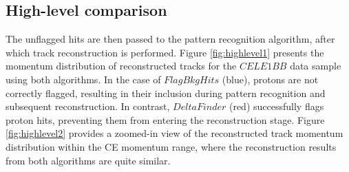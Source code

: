 \subsection{High-level comparison}
The unflagged hits are then passed to the pattern 
recognition algorithm, after which track reconstruction is performed. 
Figure \ref{fig:highlevel1} presents the momentum 
distribution of reconstructed tracks for the $CELE1BB$ 
data sample using both algorithms. 
In the case of $FlagBkgHits$ (blue), protons are not 
correctly flagged, resulting in their inclusion during 
pattern recognition and subsequent reconstruction. 
In contrast, $DeltaFinder$ (red) successfully flags 
proton hits, preventing them from entering the reconstruction stage. 
Figure \ref{fig:highlevel2} provides a zoomed-in view 
of the reconstructed track momentum distribution within 
the CE momentum range, where the reconstruction results 
from both algorithms are quite similar.


